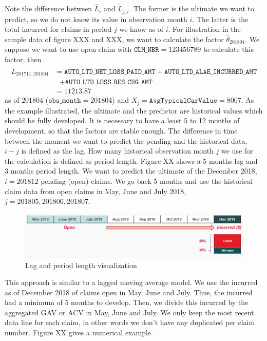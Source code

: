 	Note the difference between $\hat{L}_i$ and $\widetilde{L}_{j,i}$. The former is the ultimate we want to predict, so we do not know its value in observation month $i$. The latter is the total incurred for claims in period $j$ we know as of $i$. For illustration in the sample data of figure XXX and XXX, we want to calculate the factor $\hat{\theta}_{201804}$. We suppose we want to use open claim with $ \texttt{CLM\_NBR} = 123456789$ to calculate this factor, then 
	\begin{align*}
	\widetilde{L}_{201711, 201804} &= \texttt{AUTO\_LTD\_NET\_LOSS\_PAID\_AMT} + \texttt{AUTO\_LTD\_ALAE\_INCURRED\_AMT} \\
									& \ \ \	+ \texttt{AUTO\_LTD\_LOSS\_RES\_CHG\_AMT} \\
									&= 11213.87
	\end{align*}
	 as of $201804$ ($\texttt{obs\_month} = 201804$) and $X_j = \texttt{AvgTypicalCarValue} = 8007 $.
	As the example illustrated, the ultimate and the predictor are historical values which should be fully developed. It is necessary to have a least 5 to 12 months of development, so that the factors are stable enough. The difference in time between the moment we want to predict the pending and the historical data, $i - j$ is defined as the lag. How many historical observation month $j$ we use for the calculation is defined as period length. Figure XX shows a 5 months lag and 3 months period length. We want to predict the ultimate of the December 2018, $i = 201812$ pending (open) claims. We go back 5 months and use the historical claim data from open claims in May, June and July 2018, $j=201805, 201806, 201807$. 
	\begin{figure}[H]
		\begin{center}
			\includegraphics[scale=0.4]{Graphiques/lag_pl} 
			\renewcommand{\figurename}{Figure}
			\caption{Lag and period length visualization}\label{Fig_lag_pl}
		\end{center}
	\end{figure}
	This approach is similar to a lagged moving average model. We use the incurred as of December 2018 of claims open in May, June and July. Thus, the incurred had a minimum of 5 months to develop. Then, we divide this incurred by the aggregated GAV or ACV in May, June and July. We only keep the most recent data line for each claim, in other words we don’t have any duplicated per claim number. Figure XX gives a numerical example. 
